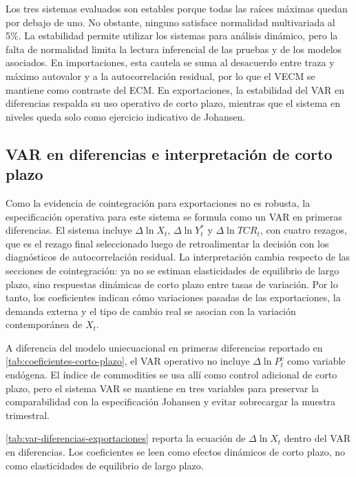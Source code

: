 \documentclass[11pt,a4paper]{article}
\begin{document}
Los tres sistemas evaluados son estables porque todas las raíces máximas quedan
por debajo de uno. No obstante, ninguno satisface normalidad multivariada al
5\%. La estabilidad permite utilizar los sistemas para análisis dinámico, pero
la falta de normalidad limita la lectura inferencial de las pruebas y de los
modelos asociados. En importaciones, esta cautela se suma al desacuerdo entre
traza y máximo autovalor y a la autocorrelación residual, por lo que el VECM se
mantiene como contraste del ECM. En exportaciones, la estabilidad del VAR en
diferencias respalda su uso operativo de corto plazo, mientras que el sistema
en niveles queda solo como ejercicio indicativo de Johansen.
	
	\subsection{VAR en diferencias e interpretación de corto plazo}
	\label{subsec:resultados-var}
	
	Como la evidencia de cointegración para exportaciones no es robusta, la
	especificación operativa para este sistema se formula como un VAR en primeras
	diferencias. El sistema incluye \(\Delta \ln X_t\),
	\(\Delta \ln Y_t^*\) y \(\Delta \ln TCR_t\), con cuatro rezagos,
	que es el rezago final seleccionado luego de retroalimentar la decisión con los
	diagnósticos de autocorrelación residual. La interpretación cambia respecto de
	las secciones de cointegración: ya no se estiman elasticidades de equilibrio de
	largo plazo, sino respuestas dinámicas de corto plazo entre tasas de variación.
	Por lo tanto, los coeficientes indican cómo variaciones pasadas de las
	exportaciones, la demanda externa y el tipo de cambio real se asocian con la
	variación contemporánea de \(X_t\).
	
	A diferencia del modelo uniecuacional en primeras diferencias reportado en
	\autoref{tab:coeficientes-corto-plazo}, el VAR operativo no incluye
	\(\Delta \ln P_t^c\) como variable endógena. El índice de commodities se usa
	allí como control adicional de corto plazo, pero el sistema VAR se mantiene en
	tres variables para preservar la comparabilidad con la especificación Johansen
	y evitar sobrecargar la muestra trimestral.
	
	\autoref{tab:var-diferencias-exportaciones} reporta la ecuación de
	\(\Delta \ln X_t\) dentro del VAR en diferencias. Los coeficientes se leen como
	efectos dinámicos de corto plazo, no como elasticidades de equilibrio de largo
	plazo.
	
\end{document}
